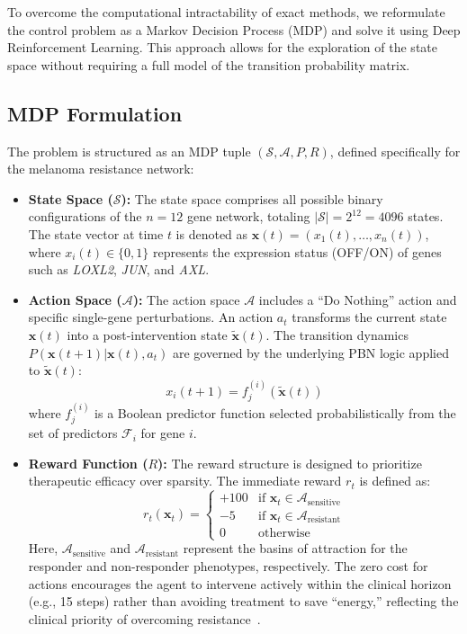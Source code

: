 \documentclass[12pt, a4paper]{report}
\begin{document}
To overcome the computational intractability of exact methods, we reformulate the control problem as a Markov Decision Process (MDP) and solve it using Deep Reinforcement Learning. This approach allows for the exploration of the state space without requiring a full model of the transition probability matrix.

\subsection{MDP Formulation}
The problem is structured as an MDP tuple $(\mathcal{S}, \mathcal{A}, P, R)$, defined specifically for the melanoma resistance network:

\begin{itemize}
	\item \textbf{State Space ($\mathcal{S}$):} The state space comprises all possible binary configurations of the $n=12$ gene network, totaling $|\mathcal{S}| = 2^{12} = 4096$ states. The state vector at time $t$ is denoted as $\mathbf{x}(t) = (x_1(t), \dots, x_n(t))$, where $x_i(t) \in \{0, 1\}$ represents the expression status (OFF/ON) of genes such as \textit{LOXL2}, \textit{JUN}, and \textit{AXL}.
	
	\item \textbf{Action Space ($\mathcal{A}$):} The action space $\mathcal{A}$ includes a ``Do Nothing'' action and specific single-gene perturbations. An action $a_t$ transforms the current state $\mathbf{x}(t)$ into a post-intervention state $\tilde{\mathbf{x}}(t)$. The transition dynamics $P(\mathbf{x}(t+1) | \mathbf{x}(t), a_t)$ are governed by the underlying PBN logic applied to $\tilde{\mathbf{x}}(t)$:
	\begin{equation}
		x_i(t+1) = f_j^{(i)}(\tilde{\mathbf{x}}(t))
	\end{equation}
	where $f_j^{(i)}$ is a Boolean predictor function selected probabilistically from the set of predictors $\mathcal{F}_i$ for gene $i$.
	
	\item \textbf{Reward Function ($R$):} The reward structure is designed to prioritize therapeutic efficacy over sparsity. The immediate reward $r_t$ is defined as:
	\begin{equation}
		r_t(\mathbf{x}_t) = 
		\begin{cases} 
			+100 & \text{if } \mathbf{x}_t \in \mathcal{A}_{\text{sensitive}} \\
			-5 & \text{if } \mathbf{x}_t \in \mathcal{A}_{\text{resistant}} \\
			0 & \text{otherwise}
		\end{cases}
	\end{equation}
	Here, $\mathcal{A}_{\text{sensitive}}$ and $\mathcal{A}_{\text{resistant}}$ represent the basins of attraction for the responder and non-responder phenotypes, respectively. The zero cost for actions encourages the agent to intervene actively within the clinical horizon (e.g., 15 steps) rather than avoiding treatment to save ``energy,'' reflecting the clinical priority of overcoming resistance~\cite{liu2025melanoma}.
\end{itemize}
\end{document}
